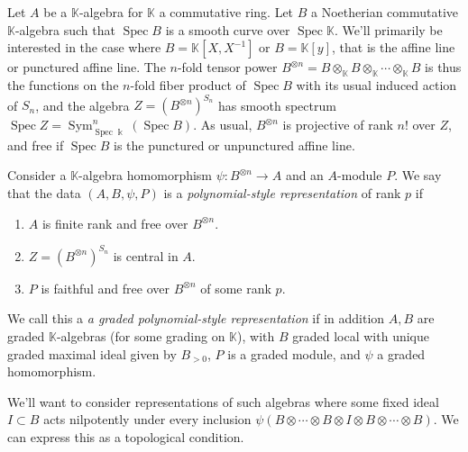 \documentclass[ALCO,ThmDefs,Unicode,epreuves]{cedram}
\DeclareMathOperator{\Spec}{Spec}
\DeclareMathOperator{\Sym}{Sym}
\newcommand{\K}{\Bbbk}%
\begin{document}
 Let $A$ be a $\mathbb{K}$-algebra for $\mathbb{K}$ a commutative
 ring. Let $B$ a Noetherian commutative $\mathbb{K}$-algebra such
 that $\Spec B$ is a smooth curve over $\Spec \mathbb{K}$. We'll
 primarily be interested in the case where $B=\mathbb{K}[X,X^{-1}]$
 or $B=\mathbb{K}[y]$, that is the affine line or punctured affine
 line. The $n$-fold tensor power $B^{\otimes
 n}=B\otimes_{\mathbb{K}} B\otimes_{\mathbb{K}} \cdots
 \otimes_{\mathbb{K}} B$ is thus the functions on the $n$-fold fiber
 product of $\Spec B$ with its usual induced action of $S_n$, and the
 algebra $Z=(B^{\otimes n})^{S_n}$ has smooth spectrum $\Spec
 Z=\Sym^n_{\Spec\K}(\Spec B)$. As usual, $B^{\otimes n}$ is projective of
 rank $n!$ over $Z$, and free if $\Spec B$ is the punctured or
 unpunctured affine line.
\begin{defi}
 Consider a $\mathbb{K}$-algebra homomorphism $\psi\colon B^{\otimes
 n}\to A$ and an $A$-module $P$. We say that the data $(A,B,\psi,P)$ is a
 \emph{polynomial-style representation} of rank $p$ if 
 \begin{enumerate}
 \item $A$ is finite rank and free over $B^{\otimes n}$.
 \item $Z=(B^{\otimes n})^{S_n}$ is central in $A$.
 \item $P$ is faithful and free
 over $B^{\otimes n} $ of some rank $p$.
 \end{enumerate}
 We call this a \emph{a graded polynomial-style representation} if in
 addition $A, B$ are graded $\mathbb{K}$-algebras (for some grading
 on $\mathbb{K}$), with $B$ graded local with unique
 graded maximal ideal given by $B_{>0}$, $P$ is a graded module, and $\psi$ a graded
 homomorphism. 
\end{defi}

We'll want to consider representations of such algebras where some fixed
ideal $I\subset B$ acts nilpotently under every inclusion
$\psi(B\otimes \cdots \otimes B\otimes I \otimes B\otimes \cdots \otimes B)$. We can
express this as a topological condition.
\end{document}
